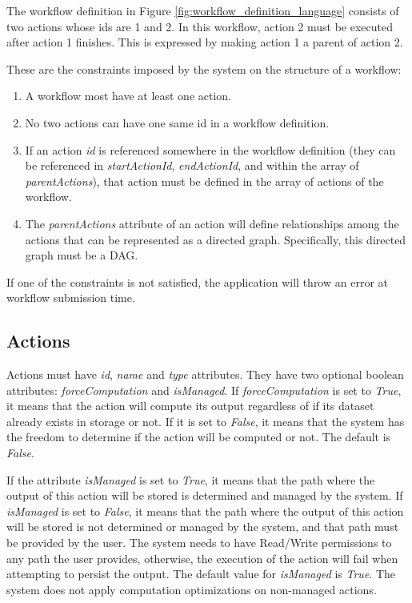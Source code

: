 The workflow definition in Figure \ref{fig:workflow_definition_language} consists of two actions whose ids are 1 and 2. In this workflow, action 2 must be executed after action 1 finishes. This is expressed by making action 1 a parent of action 2. 

These are the constraints imposed by the system on the structure of a workflow:
\begin{enumerate}
\item A workflow most have at least one action.
\item No two actions can have one same id in a workflow definition.
\item If an action \textit{id} is referenced somewhere in the workflow definition (they can be referenced in \textit{startActionId}, \textit{endActionId}, and within the array of \textit{parentActions}), that action must be defined in the array of actions of the workflow.
\item The \textit{parentActions} attribute of an action will define relationships among the actions that can be represented as a directed graph. Specifically, this directed graph must be a DAG.
\end{enumerate}

If one of the constraints is not satisfied, the application will throw an error at workflow submission time.

\subsection{Actions}
Actions must have \textit{id}, \textit{name} and \textit{type} attributes. They have two optional boolean attributes: \textit{forceComputation} and \textit{isManaged}. If \textit{forceComputation} is set to \textit{True}, it means that the action will compute its output regardless of if its dataset already exists in storage or not. If it is set to \textit{False}, it means that the system has the freedom to determine if the action will be computed or not. The default is \textit{False}.

If the attribute \textit{isManaged} is set to \textit{True}, it means that the path where the output of this action will be stored is determined and managed by the system. If \textit{isManaged} is set to \textit{False}, it means that the path where the output of this action will be stored is not determined or managed by the system, and that path must be provided by the user. The system needs to have Read/Write permissions to any path the user provides, otherwise, the execution of the action will fail when attempting to persist the output. The default value for \textit{isManaged} is \textit{True}. The system does not apply computation optimizations on non-managed actions.

